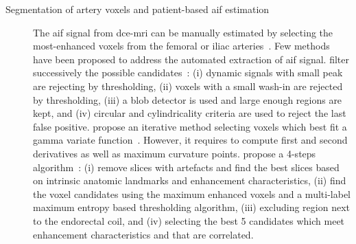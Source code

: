 \begin{description}
  \item[Segmentation of artery voxels and patient-based \ac{aif} estimation] The \ac{aif} signal from \ac{dce}-\ac{mri} can be manually estimated by selecting the most-enhanced voxels from the femoral or iliac arteries~\citep{meng2010comparison}.
    Few methods have been proposed to address the automated extraction of \ac{aif} signal.
    \citeauthor{chen2008automatic} filter successively the possible candidates~\citep{chen2008automatic}:
    (i) dynamic signals with small peak are rejecting by thresholding,
    (ii) voxels with a small wash-in are rejected by thresholding,
    (iii) a blob detector is used and large enough regions are kept, and
    (iv) circular and cylindricality criteria are used to reject the last false positive.
    \citeauthor{zhu2011automated} propose an iterative method selecting voxels which best fit a gamma variate function~\citep{zhu2011automated}.
    However, it requires to compute first and second derivatives as well as maximum curvature points.
    \citeauthor{shanbhag2012generalized} propose a 4-steps algorithm~\citep{shanbhag2012generalized,fennessy2015quantitative}:
    (i) remove slices with artefacts and find the best slices based on intrinsic anatomic landmarks and enhancement characteristics,
    (ii) find the voxel candidates using the maximum enhanced voxels and a multi-label maximum entropy based thresholding algorithm,
    (iii) excluding region next to the endorectal coil, and
    (iv) selecting the best 5 candidates which meet enhancement characteristics and that are correlated.


\end{description}
